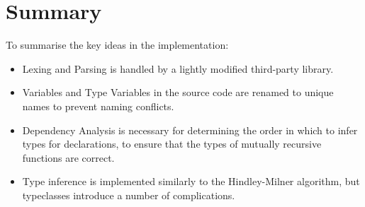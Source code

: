 \documentclass[dissertation.tex]{subfiles}
\begin{document}
\section{Summary}
{
    To summarise the key ideas in the implementation:

    \begin{itemize}
    \item Lexing and Parsing is handled by a lightly modified third-party library.
    \item Variables and Type Variables in the source code are renamed to unique names to prevent naming conflicts.
    \item
    {
        Dependency Analysis is necessary for determining the order in which to infer types for declarations, to ensure that the types of mutually recursive functions are correct.
    }
    \item
    {
        Type inference is implemented similarly to the Hindley-Milner algorithm, but typeclasses introduce a number of complications.
        
}
\end{itemize}}
\end{document}
